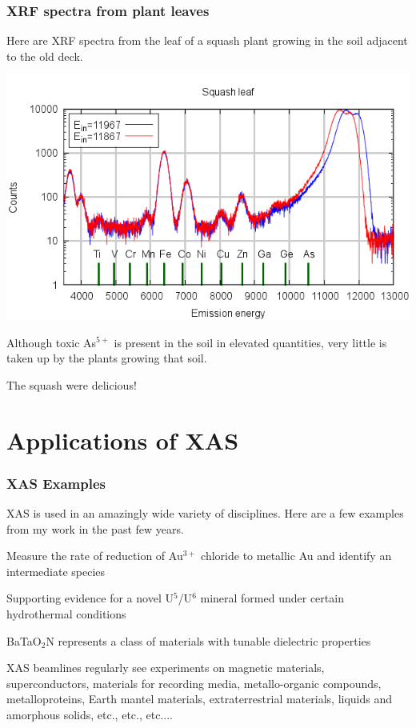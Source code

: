 \documentclass[10pt, xcolor=x11names, compress]{beamer}
\newcommand{\bton}{BaTaO$_2$N}
\begin{document}
\begin{frame}
  \frametitle{XRF spectra from plant leaves}
  Here are XRF spectra from the leaf of a squash plant growing in the
  soil adjacent to the old deck.
  \begin{center}
    \includegraphics[width=0.65\linewidth]{garden/squash_leaf.png}
  \end{center}
  Although toxic As$^{5+}$ is present in the soil in elevated
  quantities, very little is taken up by the plants growing that
  soil.

  \bigskip

  The squash were delicious!
\end{frame}

\section[XAS Applications]{Applications of XAS}

\begin{frame}
  \frametitle{XAS Examples}

  XAS is used in an amazingly wide variety of disciplines.  Here are
  a few examples from my work in the past few years.

  \bigskip

  \begin{description}
  \item[Economic geology] Measure the rate of reduction of Au$^{3+}$
    chloride to metallic Au and identify an intermediate species
  \item[Minerology] Supporting evidence for a novel U$^5$/U$^6$
    mineral formed under certain hydrothermal conditions
  \item[Dielectric materials] {\bton} represents a class of materials
    with tunable dielectric properties
  \end{description}

  \bigskip

  XAS beamlines regularly see experiments on magnetic materials,
  {\small superconductors}, {\footnotesize materials for recording
    media}, {\scriptsize metallo-organic compounds}, {\tiny
    metalloproteins, {\color{SlateGray4}Earth mantel materials},
    {\color{SlateGray3}extraterrestrial materials},
    {\color{SlateGray2}liquids and amorphous solids},
    {\color{SlateGray1}etc., etc., etc....}}
\end{frame}
\end{document}

